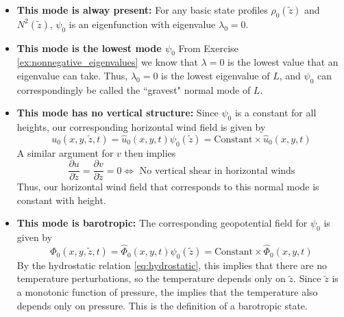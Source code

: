 \documentclass{article}
\numberwithin{equation}{section}
\newcommand{\z}{\tilde{z}}
\begin{document}
\begin{itemize}
  \item \textbf{This mode is alway present:} For any basic state profiles $\rho_0(\z)$ and $N^2(\z)$, $\psi_0$ is an eigenfunction with eigenvalue $\lambda_0=0$.
  \item \textbf{This mode is the lowest mode $\psi_0$} From Exercise \ref{ex:nonnegative_eigenvalues} we know that $\lambda=0$ is the lowest value that an eigenvalue can take. Thus, $\lambda_0=0$ is the lowest eigenvalue of $L$, and $\psi_0$ can correspondingly be called the ``gravest" normal mode of $L$.
  \item \textbf{This mode has no vertical structure:} Since $\psi_0$ is a constant for all heights, our corresponding horizontal wind field is given by
  \begin{equation}
      u_0(x, y, \z, t) = \hat{u}_0(x,y,t)\psi_0(\z) = \text{Constant}\times\hat{u}_0(x,y,t)
  \end{equation}
  A similar argument for $v$ then implies 
\begin{equation}
  \frac{\partial u}{\partial \z}= \frac{\partial v}{\partial \z}=0 \iff \text{ No vertical shear in horizontal winds}
\end{equation}
Thus, our horizontal wind field that corresponds to this normal mode is constant with height. 
\item \textbf{This mode is barotropic:} The corresponding geopotential field for $\psi_0$  is given by 
\begin{equation}
  \Phi_0(x,y,\z,t)=\hat\Phi_0(x,y,t)\psi_0(\z) = \text{Constant}\times\hat{\Phi}_0(x,y,t)
\end{equation}
By the hydrostatic relation \eqref{eq:hydrostatic}, this implies that there are no temperature perturbations, so the temperature depends only on $\z$. Since $\z$ is a monotonic function of pressure, the implies that the temperature also depends only on pressure. This is the definition of a barotropic state.


\end{itemize}
\end{document}
